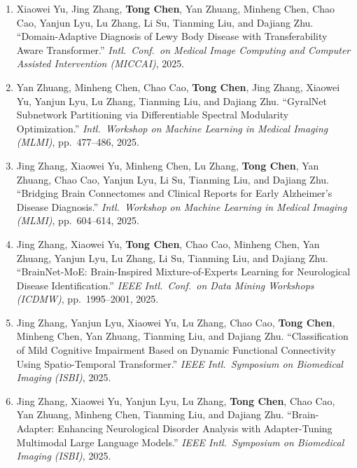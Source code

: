 \begin{enumerate}
        Yanjun Lyu, Lu Zhang, Tianming Liu, and Dajiang Zhu. ``Core-Periphery Principle
        Guided State Space Model for Functional Connectome Classification.'' \textit{Intl.\
        Conf.\ on Medical Image Computing and Computer Assisted Intervention (MICCAI)}, 2025.
  \item Xiaowei Yu, Jing Zhang, \textbf{Tong Chen}, Yan Zhuang, Minheng Chen, Chao Cao,
        Yanjun Lyu, Lu Zhang, Li Su, Tianming Liu, and Dajiang Zhu. ``Domain-Adaptive
        Diagnosis of Lewy Body Disease with Transferability Aware Transformer.''
        \textit{Intl.\ Conf.\ on Medical Image Computing and Computer Assisted Intervention
        (MICCAI)}, 2025.
  \item Yan Zhuang, Minheng Chen, Chao Cao, \textbf{Tong Chen}, Jing Zhang, Xiaowei Yu,
        Yanjun Lyu, Lu Zhang, Tianming Liu, and Dajiang Zhu. ``GyralNet Subnetwork
        Partitioning via Differentiable Spectral Modularity Optimization.'' \textit{Intl.\
        Workshop on Machine Learning in Medical Imaging (MLMI)}, pp.\ 477--486, 2025.
  \item Jing Zhang, Xiaowei Yu, Minheng Chen, Lu Zhang, \textbf{Tong Chen}, Yan Zhuang,
        Chao Cao, Yanjun Lyu, Li Su, Tianming Liu, and Dajiang Zhu. ``Bridging Brain
        Connectomes and Clinical Reports for Early Alzheimer's Disease Diagnosis.''
        \textit{Intl.\ Workshop on Machine Learning in Medical Imaging (MLMI)},
        pp.\ 604--614, 2025.
  \item Jing Zhang, Xiaowei Yu, \textbf{Tong Chen}, Chao Cao, Minheng Chen, Yan Zhuang,
        Yanjun Lyu, Lu Zhang, Li Su, Tianming Liu, and Dajiang Zhu. ``BrainNet-MoE:
        Brain-Inspired Mixture-of-Experts Learning for Neurological Disease Identification.''
        \textit{IEEE Intl.\ Conf.\ on Data Mining Workshops (ICDMW)}, pp.\ 1995--2001, 2025.
  \item Jing Zhang, Yanjun Lyu, Xiaowei Yu, Lu Zhang, Chao Cao, \textbf{Tong Chen},
        Minheng Chen, Yan Zhuang, Tianming Liu, and Dajiang Zhu. ``Classification of Mild
        Cognitive Impairment Based on Dynamic Functional Connectivity Using Spatio-Temporal
        Transformer.'' \textit{IEEE Intl.\ Symposium on Biomedical Imaging (ISBI)}, 2025.
  \item Jing Zhang, Xiaowei Yu, Yanjun Lyu, Lu Zhang, \textbf{Tong Chen}, Chao Cao,
        Yan Zhuang, Minheng Chen, Tianming Liu, and Dajiang Zhu. ``Brain-Adapter: Enhancing
        Neurological Disorder Analysis with Adapter-Tuning Multimodal Large Language
        Models.'' \textit{IEEE Intl.\ Symposium on Biomedical Imaging (ISBI)}, 2025.

\end{enumerate}
